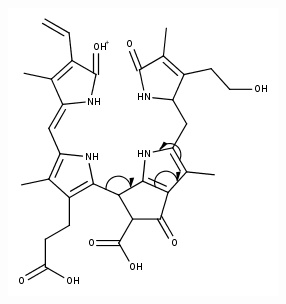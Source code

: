 \begin{figure}[!htbp]
  \begin{subfigure}[b]{0.5\textwidth}
    \includegraphics[width=\textwidth]{figures/Kapitel7/Kataboliten/fragmentation_structures/VWA_Katabolit_617_MH_RingD-RingC_331_electronMovement.png}
    \caption{}
    \label{fig:617MHElectronMovement}
  \end{subfigure}
  \hfill
  \begin{subfigure}[b]{0.5\textwidth}

\end{subfigure}
\end{figure}

